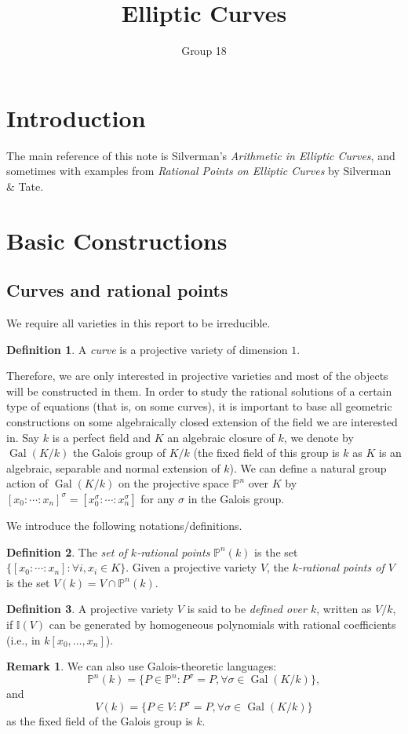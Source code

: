 \documentclass[12pt]{article}
\title{Elliptic Curves}
\author{Group 18}
\theoremstyle{remark}
\theoremstyle{definition}
\newtheorem{remark}{Remark}[subsection]
\newtheorem{definition}{Definition}[subsection]
\newcommand{\s}[0]{\sigma}
\newcommand{\Gal}[0]{\operatorname{Gal}}
\begin{document}
    \maketitle
    \tableofcontents
    \newpage
    \section{Introduction}
        The main reference of this note is Silverman's \textit{Arithmetic in Elliptic Curves}, and sometimes with examples from \textit{Rational Points on Elliptic Curves} by Silverman \& Tate.
    \section{Basic Constructions}
	\subsection{Curves and rational points}\label{sec-rat}
        We require all varieties in this report to be irreducible.
        \begin{definition}
            A \textit{curve} is a projective variety of dimension $1$.
        \end{definition}
        \noindent Therefore, we are only interested in projective varieties and most of the objects will be constructed in them. In order to study the rational solutions of a certain type of equations (that is, on some curves), it is important to base all geometric constructions on some algebraically closed extension of the field we are interested in. Say $k$ is a perfect field and $K$ an algebraic closure of $k$, we denote by $\Gal(K/k)$ the Galois group of $K/k$ (the fixed field of this group is $k$ as $K$ is an algebraic, separable and normal extension of $k$). We can define a natural group action of $\Gal(K/k)$ on the projective space $\mathbb P^n$ over $K$ by $[x_0:\cdots: x_n]^\sigma =[x_0^\sigma:\cdots: x_n^\sigma]$ for any $\sigma$ in the Galois group. 
        
        We introduce the following notations/definitions.
        \begin{definition}
            The \textit{set of $k$-rational points} $\mathbb P^n(k)$ is the set $\{[x_0:\cdots:x_n]: \forall i, x_i\in K\}$. Given a projective variety $V$, the \textit{$k$-rational points of $V$} is the set $V(k)=V\cap \mathbb P^n(k)$.
        \end{definition}
        \begin{definition}
            A projective variety $V$ is said to be \textit{defined over $k$}, written as $V/k$, if $\mathbb I(V)$ can be generated by homogeneous polynomials with rational coefficients (i.e., in $k[x_0,\dots, x_n]$).
        \end{definition}
        \begin{remark}
            We can also use Galois-theoretic languages:
            \[\mathbb P^n(k)=\{P\in \mathbb P^n:P^\s = P,\forall\s \in\Gal(K/k)\},\]
            and
            \[V(k)=\{P\in V:P^\s = P,\forall\s \in\Gal(K/k)\}\]
            as the fixed field of the Galois group is $k$.
        \end{remark}
        
\end{document}

